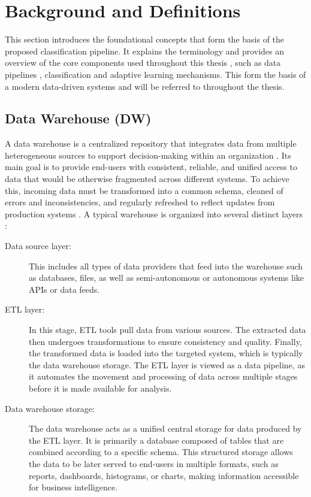 \chapter{Background and Definitions}
\label{ch:background}
This section introduces the foundational concepts that form the basis of the proposed classification pipeline. It explains the terminology and provides an overview of the core components used throughout this thesis , such as data pipelines , classification and adaptive learning mechanisms. This form the basis of a modern data-driven systems and will be referred to throughout the thesis.

%
%
\section{Data Warehouse (DW)}
\label{sec:background:data_warehouse}
A data warehouse is a centralized repository that integrates data from multiple heterogeneous sources to support decision-making within an organization \cite{vassiliadis:2009}. Its main goal is to provide end-users with consistent, reliable, and unified access to data that would be otherwise fragmented across different systems. To achieve this, incoming data must be transformed into a common schema, cleaned of errors and inconsistencies, and regularly refreshed to reflect updates from production systems \cite{bouaziz:2017}. A typical warehouse is organized into several distinct layers \cite{sajida:2015}:

\begin{description}
  \item[Data source layer:] This includes all types of data providers that feed into the warehouse such as databases, files, as well as semi-autonomous or autonomous systems like APIs or data feeds.
  \item[ETL layer:] In this stage, ETL tools pull data from various sources. The extracted data then undergoes transformations to ensure consistency and quality. Finally, the transformed data is loaded into the targeted system, which is typically the data warehouse storage. The ETL layer is viewed as a data pipeline, as it automates the movement and processing of data across multiple stages before it is made available for analysis.
  \item[Data warehouse storage:] The data warehouse acts as a unified central storage for data produced by the ETL layer. It is primarily a database composed of tables that are combined according to a specific schema. This structured storage allows the data to be later served to end-users in multiple formats, such as reports, dashboards, histograms, or charts, making information accessible for business intelligence.
\end{description}

